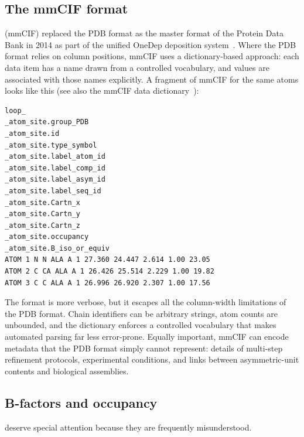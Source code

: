 \subsection{The mmCIF format}
\label{sec:mmcif-format}

 (mmCIF)
replaced the PDB format as the master format of the Protein Data Bank in
2014 as part of the unified OneDep deposition system~\cite{young2017}.
Where the PDB format relies on column positions, mmCIF uses a
dictionary-based approach: each data item has a name drawn from a
controlled vocabulary, and values are associated with those names
explicitly. A fragment of mmCIF for the same atoms looks like this (see also the
mmCIF data dictionary~\cite{hall2005}):

\begin{verbatim}
loop_
_atom_site.group_PDB
_atom_site.id
_atom_site.type_symbol
_atom_site.label_atom_id
_atom_site.label_comp_id
_atom_site.label_asym_id
_atom_site.label_seq_id
_atom_site.Cartn_x
_atom_site.Cartn_y
_atom_site.Cartn_z
_atom_site.occupancy
_atom_site.B_iso_or_equiv
ATOM 1 N N ALA A 1 27.360 24.447 2.614 1.00 23.05
ATOM 2 C CA ALA A 1 26.426 25.514 2.229 1.00 19.82
ATOM 3 C C ALA A 1 26.996 26.920 2.307 1.00 17.56
\end{verbatim}

The format is more verbose, but it escapes all the column-width
limitations of the PDB format. Chain identifiers can be arbitrary
strings, atom counts are unbounded, and the dictionary enforces
a controlled vocabulary that makes automated parsing far less
error-prone. Equally important, mmCIF can encode metadata that
the PDB format simply cannot represent: details of multi-step
refinement protocols, experimental conditions, and links between
asymmetric-unit contents and biological assemblies.

\subsection{B-factors and occupancy}
\label{sec:bfactors}

 deserve special
attention because they are frequently misunderstood.

